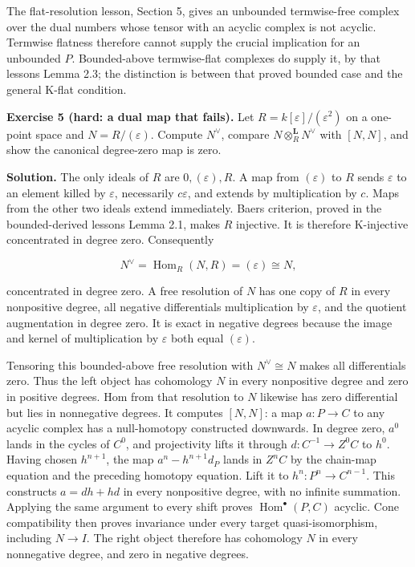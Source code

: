 \documentclass[
  english,
  11pt,
  a4paper,
]{article}
\begin{document}
The flat-resolution lesson, Section 5, gives an unbounded termwise-free
complex over the dual numbers whose tensor with an acyclic complex is
not acyclic. Termwise flatness therefore cannot supply the crucial
implication for an unbounded \(P\). Bounded-above termwise-flat
complexes do supply it, by that lesson\textquotesingle s Lemma 2.3; the
distinction is between that proved bounded case and the general K-flat
condition.

\textbf{Exercise 5 (hard: a dual map that fails).} Let
\(R=k[\varepsilon]/(\varepsilon^2)\) on a one-point space and
\(N=R/(\varepsilon)\). Compute \(N^\vee\), compare
\(N\otimes_R^{\mathbf L}N^\vee\) with \([N,N]\), and show the canonical
degree-zero map is zero.

\textbf{Solution.} The only ideals of \(R\) are \(0,(\varepsilon),R\). A
map from \((\varepsilon)\) to \(R\) sends \(\varepsilon\) to an element
killed by \(\varepsilon\), necessarily \(c\varepsilon\), and extends by
multiplication by \(c\). Maps from the other two ideals extend
immediately. Baer\textquotesingle s criterion, proved in the
bounded-derived lesson\textquotesingle s Lemma 2.1, makes \(R\)
injective. It is therefore K-injective concentrated in degree zero.
Consequently

\[N^\vee=\operatorname{Hom}_R(N,R)
=(\varepsilon)\cong N,\]

concentrated in degree zero. A free resolution of \(N\) has one copy of
\(R\) in every nonpositive degree, all negative differentials
multiplication by \(\varepsilon\), and the quotient augmentation in
degree zero. It is exact in negative degrees because the image and
kernel of multiplication by \(\varepsilon\) both equal
\((\varepsilon)\).

Tensoring this bounded-above free resolution with \(N^\vee\cong N\)
makes all differentials zero. Thus the left object has cohomology \(N\)
in every nonpositive degree and zero in positive degrees. Hom from that
resolution to \(N\) likewise has zero differential but lies in
nonnegative degrees. It computes \([N,N]\): a map \(a:P\to C\) to any
acyclic complex has a null-homotopy constructed downwards. In degree
zero, \(a^0\) lands in the cycles of \(C^0\), and projectivity lifts it
through \(d:C^{-1}\to Z^0C\) to \(h^0\). Having chosen \(h^{n+1}\), the
map \(a^n-h^{n+1}d_P\) lands in \(Z^nC\) by the chain-map equation and
the preceding homotopy equation. Lift it to \(h^n:P^n\to C^{n-1}\). This
constructs \(a=dh+hd\) in every nonpositive degree, with no infinite
summation. Applying the same argument to every shift proves
\(\operatorname{Hom}^\bullet(P,C)\) acyclic. Cone compatibility then
proves invariance under every target quasi-isomorphism, including
\(N\to I\). The right object therefore has cohomology \(N\) in every
nonnegative degree, and zero in negative degrees.
\end{document}
